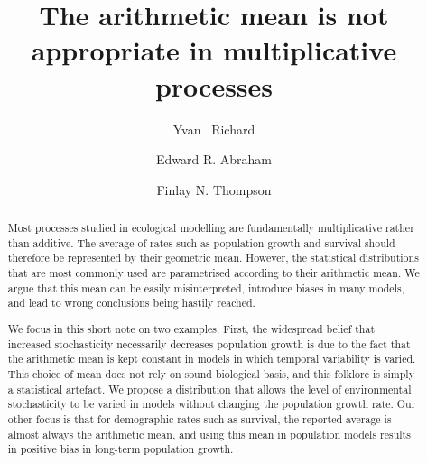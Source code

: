 \documentclass[preprint,authoryear,12pt]{elsarticle}
\begin{document}
\begin{frontmatter}



\title{The arithmetic mean is not appropriate in multiplicative processes}


\author{Yvan ~Richard}
\author{Edward R. Abraham}
\author{Finlay N. Thompson}
\address{Dragonfly Science, PO Box 27535, Wellington 6141, New Zealand}

\begin{abstract}
  Most processes studied in ecological modelling are fundamentally
  multiplicative rather than additive. The average of rates such as
  population growth and survival should therefore be represented by
  their geometric mean. However, the statistical distributions that
  are most commonly used are parametrised according to their
  arithmetic mean. We argue that this mean can be easily
  misinterpreted, introduce biases in many models, and lead to wrong
  conclusions being hastily reached.

  We focus in this short note on two examples. First, the widespread
  belief that increased stochasticity necessarily decreases population
  growth is due to the fact that the arithmetic mean is kept constant
  in models in which temporal variability is varied. This choice of
  mean does not rely on sound biological basis, and this folklore is
  simply a statistical artefact. We propose a distribution that allows
  the level of environmental stochasticity to be varied in models
  without changing the population growth rate. Our other focus is that
  for demographic rates such as survival, the reported average is
  almost always the arithmetic mean, and using this mean in population
  models results in positive bias in long-term population growth.


\end{abstract}
\end{frontmatter}
\end{document}
